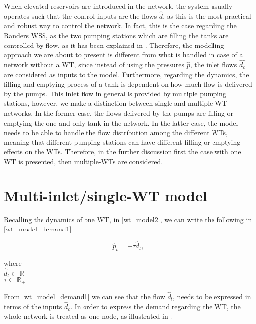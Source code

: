 When elevated reservoirs are introduced in the network, the system usually operates such that the control inputs are the flows $\hat{d}$, as this is the most practical and robust way to control the network. In fact, this is the case regarding the Randers WSS, as the two pumping stations which are filling the tanks are controlled by flow, as it has been explained in . Therefore, the modelling approach we are about to present is different from what is handled in case of a network without a WT, since instead of using the pressures $\hat{p}$, the inlet flows $\hat{d_c}$ are considered as inputs to the model. Furthermore, regarding the dynamics, the filling and emptying process of a tank is dependent on how much flow is delivered by the pumps. This inlet flow in general is provided by multiple pumping stations, however, we make a distinction between single and multiple-WT  networks. In the former case, the flows delivered by the pumps are filling or emptying the one and only tank in the network. In the latter case, the model needs to be able to handle the flow distribution among the different WTs, meaning that different pumping stations can have different filling or emptying effects on the WTs. Therefore, in the further discussion first the case with one WT is presented, then multiple-WTs are considered.


\section{Multi-inlet/single-WT model}
\label{multi_inlet_single_WT_model}

Recalling the dynamics of one WT, in \eqref{wt_model2}, we can write the following in \eqref{wt_model_demand1}.

\begin{equation}
\label{wt_model_demand1}
\dot{\hat{p}}_{t} = -\tau \hat{d}_{t},
\end{equation}
\vspace{-3mm}

 \begin{minipage}[t]{0.20\textwidth}
where\\
\hspace*{8mm} $\hat{d}_t  \in \: \mathbb{R}$ \\
\hspace*{8mm} $\tau  \in \: \mathbb{R_{+}}$
\end{minipage}

From \eqref{wt_model_demand1} we can see that the flow $\hat{d}_t$, needs to be expressed in terms of the inputs $\hat{d}_c$. In order to express the demand regarding the WT, the whole network is treated as one node, as illustrated in . 

